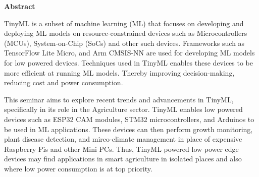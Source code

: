 \vspace{.25in}
\begin{center}
\large{\textbf{Abstract}}\\
\vspace{0.3in}
\end{center}
\indent


TinyML is a subset of machine learning (ML) that focuses on developing and deploying
ML models on resource-constrained devices such as Microcontrollers (MCUs), System-on-Chip
(SoCs) and other such devices. Frameworks such as TensorFlow Lite Micro, and Arm CMSIS-NN
are used for developing ML models for low powered devices. Techniques used in TinyML
enables these devices to be more efficient at running ML models. Thereby improving
decision-making, reducing cost and power consumption.


This seminar aims to explore recent trends and advancements in TinyML, specifically in its role in the
Agriculture sector. TinyML enables low powered devices such as ESP32 CAM modules, STM32
microcontrollers, and Arduinos to be used in ML applications. These devices can then
perform growth monitoring, plant disease detection, and mirco-climate management in
place of expensive Raspberry Pis and other Mini PCs. Thus, TinyML powered low power
edge devices may find applications in smart agriculture in isolated places and also where
low power consumption is at top priority.
